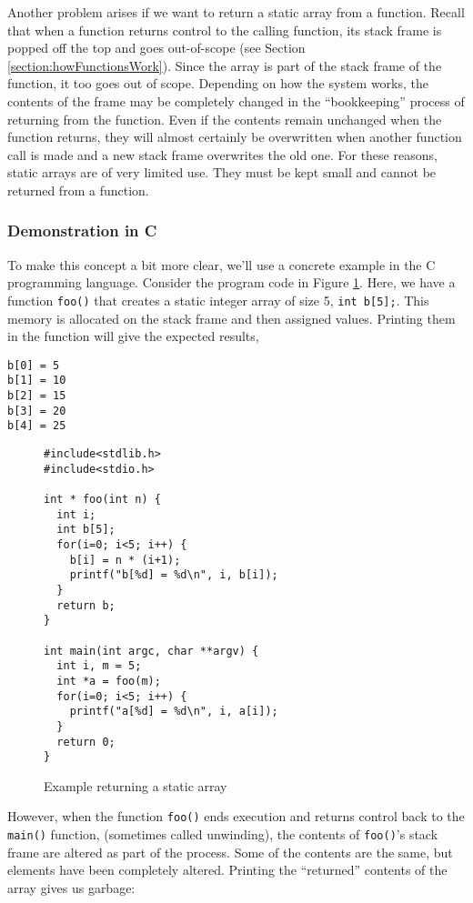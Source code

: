 Another problem arises if we want to return a static array from
a function.  Recall that when a function returns control to the 
calling function, its stack frame is popped off the top and 
goes out-of-scope (see Section \ref{section:howFunctionsWork}).
Since the array is part of the stack frame of the function, it
too goes out of scope.  Depending on how the system works, 
the contents of the frame may be completely changed in the
``bookkeeping'' process of returning from the function.  Even
if the contents remain unchanged when the function returns,
they will almost certainly be overwritten when another function
call is made and a new stack frame overwrites the old one.
For these reasons, static arrays are of very limited use.  They
must be kept small and cannot be returned from a function.

\subsubsection{Demonstration in C}

To make this concept a bit more clear, we'll use a concrete
example in the C programming language.  Consider the 
program code in Figure \ref{code:returnStaticArray}.  Here,
we have a function \texttt{foo()} that creates a
static integer array of size 5, \texttt{int b[5];}.  This
memory is allocated on the stack frame and then assigned
values.  Printing them in the function will give the expected
results, 

\begin{verbatim}
b[0] = 5
b[1] = 10
b[2] = 15
b[3] = 20
b[4] = 25
\end{verbatim}

\begin{figure}[!h]
\centering
\begin{verbatim}
#include<stdlib.h>
#include<stdio.h>

int * foo(int n) {
  int i;
  int b[5];
  for(i=0; i<5; i++) {
    b[i] = n * (i+1);
    printf("b[%d] = %d\n", i, b[i]);
  }
  return b;
}

int main(int argc, char **argv) {
  int i, m = 5;
  int *a = foo(m);
  for(i=0; i<5; i++) {
    printf("a[%d] = %d\n", i, a[i]);
  }
  return 0;
}
\end{verbatim}
\caption{Example returning a static array}
\label{code:returnStaticArray}
\end{figure}

However, when the function \texttt{foo()} ends execution and 
returns control back to the \texttt{main()} function, (sometimes 
called \gls{unwinding}), the contents of \texttt{foo()}'s stack
frame are altered as part of the process.  Some of the contents are the
same, but elements have been completely altered.  Printing the ``returned'' 
contents of the array gives us garbage:  

